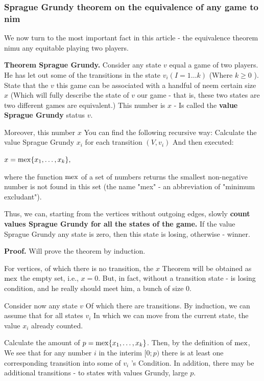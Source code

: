 \subsubsection{ Sprague Grundy theorem on the equivalence of any game to nim }

We now turn to the most important fact in this article - the equivalence theorem nimu any equitable playing two players.

\textbf{Theorem Sprague Grundy.} Consider any state $v$ equal a game of two players. He has let out some of the transitions in the state $v_i$$(I = 1 \ldots k)$ (Where $k \ge 0$ ). State that the $v$ this game can be associated with a handful of neem certain size $x$ (Which will fully describe the state of $v$ our game - that is, these two states are two different games are equivalent.) This number is $x$ - Is called the \textbf{value Sprague Grundy} status $v$.

Moreover, this number $x$ You can find the following recursive way: Calculate the value Sprague Grundy $x_i$ for each transition $(V, v_i)$ And then executed:

$x = {\rm mex} \{x_1, \ldots, x_k \},$

where the function $\rm mex$ of a set of numbers returns the smallest non-negative number is not found in this set (the name "mex" - an abbreviation of "minimum excludant").

Thus, we can, starting from the vertices without outgoing edges, slowly \textbf{count values ​​Sprague Grundy for all the states of the game.} If the value Sprague Grundy any state is zero, then this state is losing, otherwise - winner.

\textbf{Proof.} Will prove the theorem by induction.

For vertices, of which there is no transition, the $x$ Theorem will be obtained as $\rm mex$ the empty set, i.e., $x = 0$. But, in fact, without a transition state - is losing condition, and he really should meet him, a bunch of size $0$.

Consider now any state $v$ Of which there are transitions. By induction, we can assume that for all states $v_i$ In which we can move from the current state, the value $x_i$ already counted.

Calculate the amount of $p = {\rm mex} \{x_1, \ldots, x_k \}$. Then, by the definition of $\rm mex$, We see that for any number $i$ in the interim $[0; p)$ there is at least one corresponding transition into some of $v_i$ 's Condition. In addition, there may be additional transitions - to states with values ​​Grundy, large $p$.


